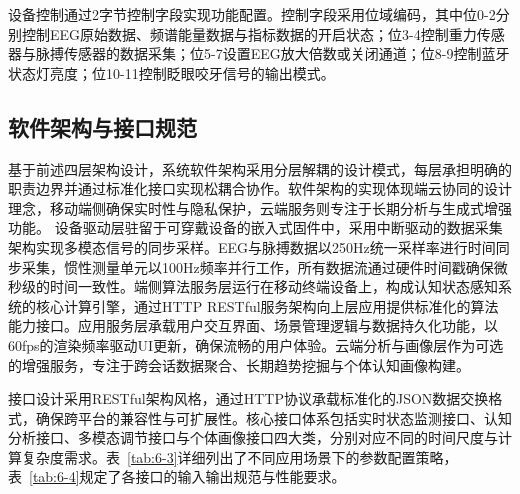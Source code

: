 设备控制通过2字节控制字段实现功能配置。控制字段采用位域编码，其中位0-2分别控制EEG原始数据、频谱能量数据与指标数据的开启状态；位3-4控制重力传感器与脉搏传感器的数据采集；位5-7设置EEG放大倍数或关闭通道；位8-9控制蓝牙状态灯亮度；位10-11控制眨眼咬牙信号的输出模式。

\subsection{软件架构与接口规范}

基于前述四层架构设计，系统软件架构采用分层解耦的设计模式，每层承担明确的职责边界并通过标准化接口实现松耦合协作。软件架构的实现体现端云协同的设计理念，移动端侧确保实时性与隐私保护，云端服务则专注于长期分析与生成式增强功能。
设备驱动层驻留于可穿戴设备的嵌入式固件中，采用中断驱动的数据采集架构实现多模态信号的同步采样。EEG与脉搏数据以250Hz统一采样率进行时间同步采集，惯性测量单元以100Hz频率并行工作，所有数据流通过硬件时间戳确保微秒级的时间一致性。端侧算法服务层运行在移动终端设备上，构成认知状态感知系统的核心计算引擎，通过HTTP RESTful服务架构向上层应用提供标准化的算法能力接口。应用服务层承载用户交互界面、场景管理逻辑与数据持久化功能，以60fps的渲染频率驱动UI更新，确保流畅的用户体验。云端分析与画像层作为可选的增强服务，专注于跨会话数据聚合、长期趋势挖掘与个体认知画像构建。

接口设计采用RESTful架构风格，通过HTTP协议承载标准化的JSON数据交换格式，确保跨平台的兼容性与可扩展性。核心接口体系包括实时状态监测接口、认知分析接口、多模态调节接口与个体画像接口四大类，分别对应不同的时间尺度与计算复杂度需求。表~\ref{tab:6-3}详细列出了不同应用场景下的参数配置策略，表~\ref{tab:6-4}规定了各接口的输入输出规范与性能要求。


\begin{table}[htbp]
\centering
\caption{不同应用场景的参数配置策略}
\label{tab:6-3}
\end{table}


